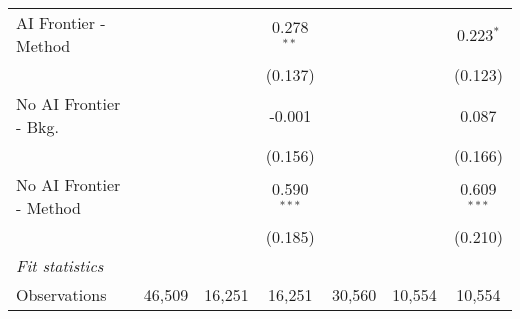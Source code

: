 \begin{tabular}{lcccccc}
   AI Frontier - Method    &               &         & 0.278$^{**}$  &              &         & 0.223$^{*}$\\   
                           &               &         & (0.137)       &              &         & (0.123)\\   
   No AI Frontier - Bkg.   &               &         & -0.001        &              &         & 0.087\\   
                           &               &         & (0.156)       &              &         & (0.166)\\   
   No AI Frontier - Method &               &         & 0.590$^{***}$ &              &         & 0.609$^{***}$\\   
                           &               &         & (0.185)       &              &         & (0.210)\\   
   \midrule
   \emph{Fit statistics}\\
   Observations            & 46,509        & 16,251  & 16,251        & 30,560       & 10,554  & 10,554\\  
   

\end{tabular}
